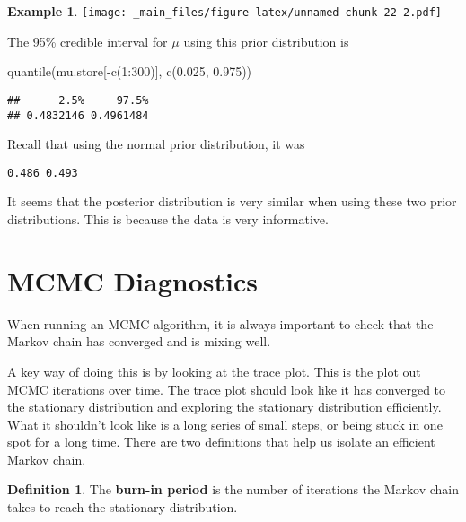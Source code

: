 \documentclass[
]{book}
\newenvironment{Shaded}{\begin{snugshade}}{\end{snugshade}}
\newcommand{\DecValTok}[1]{\textcolor[rgb]{0.00,0.00,0.81}{#1}}
\newcommand{\FloatTok}[1]{\textcolor[rgb]{0.00,0.00,0.81}{#1}}
\newcommand{\FunctionTok}[1]{\textcolor[rgb]{0.00,0.00,0.00}{#1}}
\newcommand{\NormalTok}[1]{#1}
\newcommand{\SpecialCharTok}[1]{\textcolor[rgb]{0.00,0.00,0.00}{#1}}
\theoremstyle{definition}
\newtheorem{definition}{Definition}[chapter]
\theoremstyle{definition}
\newtheorem{example}{Example}[chapter]
\theoremstyle{definition}
\theoremstyle{definition}
\theoremstyle{remark}
\begin{document}
\begin{example}
\texttt{[image: \_main\_files/figure-latex/unnamed-chunk-22-2.pdf]}

The 95\% credible interval for \(\mu\) using this prior distribution is

\begin{Shaded}
\begin{Highlighting}[]
\FunctionTok{quantile}\NormalTok{(mu.store[}\SpecialCharTok{{-}}\FunctionTok{c}\NormalTok{(}\DecValTok{1}\SpecialCharTok{:}\DecValTok{300}\NormalTok{)], }\FunctionTok{c}\NormalTok{(}\FloatTok{0.025}\NormalTok{, }\FloatTok{0.975}\NormalTok{))}
\end{Highlighting}
\end{Shaded}

\begin{verbatim}
##      2.5%     97.5% 
## 0.4832146 0.4961484
\end{verbatim}

Recall that using the normal prior distribution, it was

\begin{verbatim}
0.486 0.493
\end{verbatim}

It seems that the posterior distribution is very similar when using these two prior distributions. This is because the data is very informative.
\end{example}

\hypertarget{mcmc-diagnostics}{%
\section{MCMC Diagnostics}\label{mcmc-diagnostics}}

When running an MCMC algorithm, it is always important to check that the Markov chain has converged and is mixing well.

A key way of doing this is by looking at the trace plot. This is the plot out MCMC iterations over time. The trace plot should look like it has converged to the stationary distribution and exploring the stationary distribution efficiently. What it shouldn't look like is a long series of small steps, or being stuck in one spot for a long time. There are two definitions that help us isolate an efficient Markov chain.

\begin{definition}
The \textbf{burn-in period} is the number of iterations the Markov chain takes to reach the stationary distribution.
\end{definition}
\end{document}
